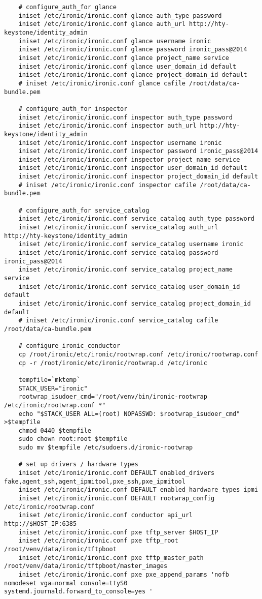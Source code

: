 \documentclass[a4paper,left=2.5cm,right=2.5cm,11pt]{article}
\begin{document}
\begin{lstlisting}
    # configure_auth_for glance
	iniset /etc/ironic/ironic.conf glance auth_type password
    iniset /etc/ironic/ironic.conf glance auth_url http://hty-keystone/identity_admin
    iniset /etc/ironic/ironic.conf glance username ironic
    iniset /etc/ironic/ironic.conf glance password ironic_pass@2014
    iniset /etc/ironic/ironic.conf glance project_name service
    iniset /etc/ironic/ironic.conf glance user_domain_id default
    iniset /etc/ironic/ironic.conf glance project_domain_id default
    # iniset /etc/ironic/ironic.conf glance cafile /root/data/ca-bundle.pem

	# configure_auth_for inspector
	iniset /etc/ironic/ironic.conf inspector auth_type password
    iniset /etc/ironic/ironic.conf inspector auth_url http://hty-keystone/identity_admin
    iniset /etc/ironic/ironic.conf inspector username ironic
    iniset /etc/ironic/ironic.conf inspector password ironic_pass@2014
    iniset /etc/ironic/ironic.conf inspector project_name service
    iniset /etc/ironic/ironic.conf inspector user_domain_id default
    iniset /etc/ironic/ironic.conf inspector project_domain_id default
    # iniset /etc/ironic/ironic.conf inspector cafile /root/data/ca-bundle.pem

	# configure_auth_for service_catalog
	iniset /etc/ironic/ironic.conf service_catalog auth_type password
    iniset /etc/ironic/ironic.conf service_catalog auth_url http://hty-keystone/identity_admin
    iniset /etc/ironic/ironic.conf service_catalog username ironic
    iniset /etc/ironic/ironic.conf service_catalog password ironic_pass@2014
    iniset /etc/ironic/ironic.conf service_catalog project_name service
    iniset /etc/ironic/ironic.conf service_catalog user_domain_id default
    iniset /etc/ironic/ironic.conf service_catalog project_domain_id default
    # iniset /etc/ironic/ironic.conf service_catalog cafile /root/data/ca-bundle.pem

	# configure_ironic_conductor
    cp /root/ironic/etc/ironic/rootwrap.conf /etc/ironic/rootwrap.conf
    cp -r /root/ironic/etc/ironic/rootwrap.d /etc/ironic

	tempfile=`mktemp`
	STACK_USER="ironic"
	rootwrap_isudoer_cmd="/root/venv/bin/ironic-rootwrap /etc/ironic/rootwrap.conf *"
	echo "$STACK_USER ALL=(root) NOPASSWD: $rootwrap_isudoer_cmd" >$tempfile
    chmod 0440 $tempfile
    sudo chown root:root $tempfile
    sudo mv $tempfile /etc/sudoers.d/ironic-rootwrap

	# set up drivers / hardware types
    iniset /etc/ironic/ironic.conf DEFAULT enabled_drivers fake,agent_ssh,agent_ipmitool,pxe_ssh,pxe_ipmitool
    iniset /etc/ironic/ironic.conf DEFAULT enabled_hardware_types ipmi
    iniset /etc/ironic/ironic.conf DEFAULT rootwrap_config /etc/ironic/rootwrap.conf
    iniset /etc/ironic/ironic.conf conductor api_url http://$HOST_IP:6385
	iniset /etc/ironic/ironic.conf pxe tftp_server $HOST_IP
    iniset /etc/ironic/ironic.conf pxe tftp_root /root/venv/data/ironic/tftpboot
    iniset /etc/ironic/ironic.conf pxe tftp_master_path /root/venv/data/ironic/tftpboot/master_images
	iniset /etc/ironic/ironic.conf pxe pxe_append_params 'nofb nomodeset vga=normal console=ttyS0 systemd.journald.forward_to_console=yes '


\end{lstlisting}
\end{document}
